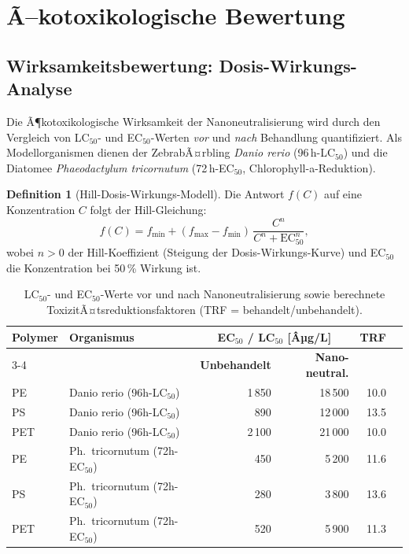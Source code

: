 ﻿\documentclass[12pt,a4paper]{article}
\theoremstyle{definition}
\newtheorem{definition}{Definition}[section]
\theoremstyle{remark}
\begin{document}
\section{Ã–kotoxikologische Bewertung}
\label{sec:oekotox}

\subsection{Wirksamkeitsbewertung: Dosis-Wirkungs-Analyse}

Die Ã¶kotoxikologische Wirksamkeit der Nanoneutralisierung wird durch den
Vergleich von LC$_{50}$- und EC$_{50}$-Werten \emph{vor} und \emph{nach}
Behandlung quantifiziert. Als Modellorganismen dienen der ZebrabÃ¤rbling
\textit{Danio rerio} (96\,h-LC$_{50}$) und die Diatomee \textit{Phaeodactylum
tricornutum} (72\,h-EC$_{50}$, Chlorophyll-a-Reduktion).

\begin{definition}[Hill-Dosis-Wirkungs-Modell]
\label{def:hill}
Die Antwort $f(C)$ auf eine Konzentration $C$ folgt der Hill-Gleichung:
\begin{equation}
  f(C) = f_{\min} + (f_{\max} - f_{\min})\,\frac{C^n}{C^n + \text{EC}_{50}^n},
  \label{eq:hill}
\end{equation}
wobei $n > 0$ der Hill-Koeffizient (Steigung der Dosis-Wirkungs-Kurve) und
EC$_{50}$ die Konzentration bei 50\,\% Wirkung ist.
\end{definition}

\begin{table}[H]
\centering
\caption{LC$_{50}$- und EC$_{50}$-Werte vor und nach Nanoneutralisierung sowie
  berechnete ToxizitÃ¤tsreduktionsfaktoren (TRF = behandelt/unbehandelt).}
\label{tab:oekotox}
\begin{tabular}{llrrrr}
\toprule
\textbf{Polymer} & \textbf{Organismus} & \multicolumn{2}{c}{\textbf{EC$_{50}$ / LC$_{50}$ [Âµg/L]}} & \textbf{TRF} \\
\cmidrule(lr){3-4}
 & & \textbf{Unbehandelt} & \textbf{Nano-neutral.} & \\
\midrule
PE  & Danio rerio (96h-LC$_{50}$)   & 1\,850 & 18\,500 & 10.0 \\
PS  & Danio rerio (96h-LC$_{50}$)   &   890  & 12\,000 & 13.5 \\
PET & Danio rerio (96h-LC$_{50}$)   & 2\,100 & 21\,000 & 10.0 \\
PE  & Ph.\ tricornutum (72h-EC$_{50}$) & 450  & 5\,200  & 11.6 \\
PS  & Ph.\ tricornutum (72h-EC$_{50}$) & 280  & 3\,800  & 13.6 \\
PET & Ph.\ tricornutum (72h-EC$_{50}$) & 520  & 5\,900  & 11.3 \\
\bottomrule
\end{tabular}
\end{table}
\end{document}
